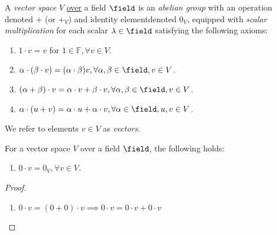 
\begin{definition}
    A \emph{vector space} $V$ \underline{over} a field $\field$ is an \emph{abelian group} with an operation denoted $+$ (or $+_V$) and identity element\footnotemark denoted $0_V$, equipped with \emph{scalar multiplication} for each scalar $\lambda \in \field$ satisfying the following axioms:
    \begin{enumerate}
        \item $1 \cdot v = v$ for $1 \in \mathbb{F}, \forall v \in V$.
        \item $\alpha\cdot(\beta \cdot v) = (\alpha \cdot \beta)v, \forall \alpha, \beta \in \field, v \in V$.
        \item $(\alpha + \beta) \cdot v = \alpha \cdot v + \beta \cdot v, \forall \alpha, \beta \in \field, v \in V$.
        \item $\alpha \cdot (u + v) = \alpha \cdot u + \alpha \cdot v, \forall \alpha \in \field, u, v \in V$.
    \end{enumerate}
    We refer to elements $v \in V$ as \emph{vectors}.
\end{definition}

\begin{proposition}
    For a vector space $V$ over a field $\field$, the following holds:
    \begin{enumerate}
        \item $0 \cdot v = 0_V, \forall v \in V$.
    \end{enumerate}
\end{proposition}

\begin{proof}
    \begin{enumerate}
        \item $0\cdot v = (0 + 0) \cdot v \implies 0 \cdot v = 0 \cdot v + 0 \cdot v$
    \end{enumerate}
\end{proof}